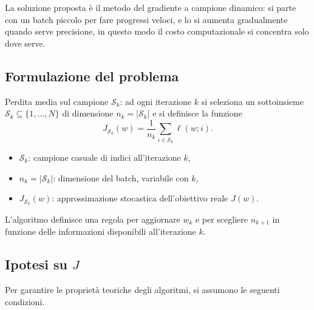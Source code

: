 \documentclass[a4paper,12pt]{article}
\numberwithin{equation}{section}
\numberwithin{figure}{section}
\numberwithin{table}{section}
\begin{document}
La soluzione proposta è il metodo del gradiente a campione dinamico: si parte con un batch piccolo per fare progressi veloci, e lo si aumenta gradualmente quando serve precisione, in questo modo il costo computazionale si concentra solo dove serve.

\subsection{Formulazione del problema}

\begin{definitionbox}
  Perdita media sul campione $\mathcal{S}_k$: ad ogni iterazione $k$ si seleziona un sottoinsieme $\mathcal{S}_k \subseteq \{1,\dots,N\}$ di dimensione $n_k = |\mathcal{S}_k|$ e si definisce la funzione
  \[
    J_{\mathcal{S}_k}(w) = \frac{1}{n_k} \sum_{i \in \mathcal{S}_k} \ell(w;i).
  \]
  \begin{itemize}
    \item $\mathcal{S}_k$: campione casuale di indici all'iterazione $k$,
    \item $n_k = |\mathcal{S}_k|$: dimensione del batch, variabile con $k$,
    \item $J_{\mathcal{S}_k}(w)$: approssimazione stocastica dell'obiettivo reale $J(w)$.
  \end{itemize}
  L'algoritmo definisce una regola per aggiornare $w_k$ e per scegliere $n_{k+1}$ in funzione delle informazioni disponibili all'iterazione $k$.
\end{definitionbox}

\subsection{Ipotesi su $J$}

Per garantire le propriet\`a teoriche degli algoritmi, si assumono le seguenti condizioni.
\end{document}
